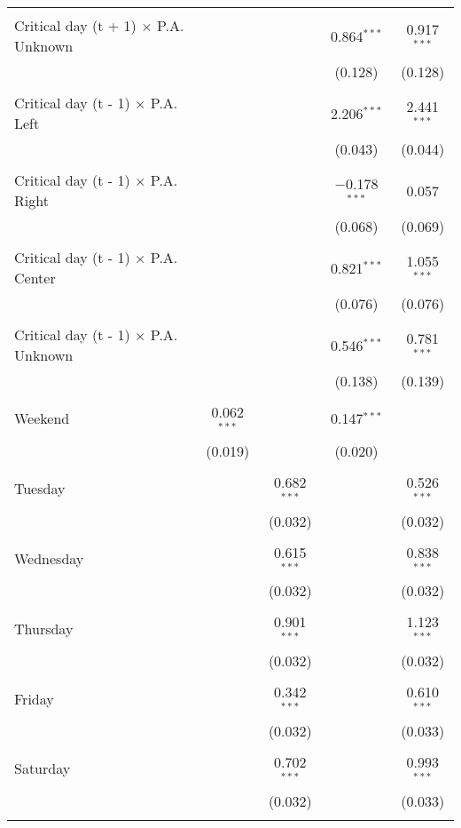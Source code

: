 \documentclass[
]{article}
\begin{document}
\begin{table}[!htbp]
{\begin{tabular}{@{\extracolsep{5pt}}lcccc}
  & & & & \\ 
 Critical day (t + 1) $\times$ P.A. Unknown &  &  & 0.864$^{***}$ & 0.917$^{***}$ \\ 
  &  &  & (0.128) & (0.128) \\ 
  & & & & \\ 
 Critical day (t - 1) $\times$ P.A. Left &  &  & 2.206$^{***}$ & 2.441$^{***}$ \\ 
  &  &  & (0.043) & (0.044) \\ 
  & & & & \\ 
 Critical day (t - 1) $\times$ P.A. Right &  &  & $-$0.178$^{***}$ & 0.057 \\ 
  &  &  & (0.068) & (0.069) \\ 
  & & & & \\ 
 Critical day (t - 1) $\times$ P.A. Center &  &  & 0.821$^{***}$ & 1.055$^{***}$ \\ 
  &  &  & (0.076) & (0.076) \\ 
  & & & & \\ 
 Critical day (t - 1) $\times$ P.A. Unknown &  &  & 0.546$^{***}$ & 0.781$^{***}$ \\ 
  &  &  & (0.138) & (0.139) \\ 
  & & & & \\ 
 Weekend & 0.062$^{***}$ &  & 0.147$^{***}$ &  \\ 
  & (0.019) &  & (0.020) &  \\ 
  & & & & \\ 
 Tuesday &  & 0.682$^{***}$ &  & 0.526$^{***}$ \\ 
  &  & (0.032) &  & (0.032) \\ 
  & & & & \\ 
 Wednesday &  & 0.615$^{***}$ &  & 0.838$^{***}$ \\ 
  &  & (0.032) &  & (0.032) \\ 
  & & & & \\ 
 Thursday &  & 0.901$^{***}$ &  & 1.123$^{***}$ \\ 
  &  & (0.032) &  & (0.032) \\ 
  & & & & \\ 
 Friday &  & 0.342$^{***}$ &  & 0.610$^{***}$ \\ 
  &  & (0.032) &  & (0.033) \\ 
  & & & & \\ 
 Saturday &  & 0.702$^{***}$ &  & 0.993$^{***}$ \\ 
  &  & (0.032) &  & (0.033) \\ 
  & & & & \\ 

\end{tabular}}
\end{table}
\end{document}
